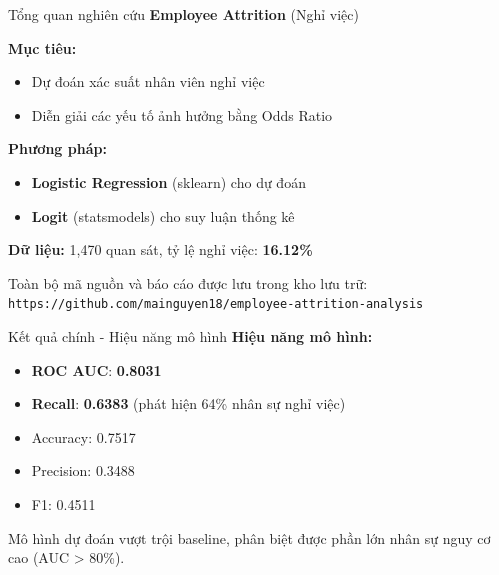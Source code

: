 \begin{frame}{Tổng quan nghiên cứu}
  \Large \textbf{Employee Attrition} (Nghỉ việc)
  
  \vspace{0.4cm}
  \textbf{Mục tiêu:}
  \begin{itemize}
    \item Dự đoán xác suất nhân viên nghỉ việc
    \item Diễn giải các yếu tố ảnh hưởng bằng Odds Ratio
  \end{itemize}
  
  \vspace{0.4cm}
  \textbf{Phương pháp:}
  \begin{itemize}
    \item \textbf{Logistic Regression} (sklearn) cho dự đoán
    \item \textbf{Logit} (statsmodels) cho suy luận thống kê
  \end{itemize}
  
  \vspace{0.4cm}
  \textbf{Dữ liệu:} 1{,}470 quan sát, tỷ lệ nghỉ việc: \textbf{16.12\%}

  \vspace{0.4cm}
  \small Toàn bộ mã nguồn và báo cáo được lưu trong kho lưu trữ:
  \texttt{https://github.com/mainguyen18/employee-attrition-analysis}
\end{frame}

\begin{frame}{Kết quả chính - Hiệu năng mô hình}
  \textbf{Hiệu năng mô hình:}
  
  \vspace{0.3cm}
  \begin{itemize}
    \item \textcolor{accentblue}{\textbf{ROC AUC}}: \Large \textbf{0.8031}
    \item \textcolor{accentblue}{\textbf{Recall}}: \Large \textbf{0.6383} (phát hiện 64\% nhân sự nghỉ việc)
    \item Accuracy: 0.7517
    \item Precision: 0.3488
    \item F1: 0.4511
  \end{itemize}
  
  \vspace{0.4cm}
  \begin{alertblock}{}
    Mô hình dự đoán vượt trội baseline, phân biệt được phần lớn nhân sự nguy cơ cao (AUC > 80\%).
  \end{alertblock}
\end{frame}

